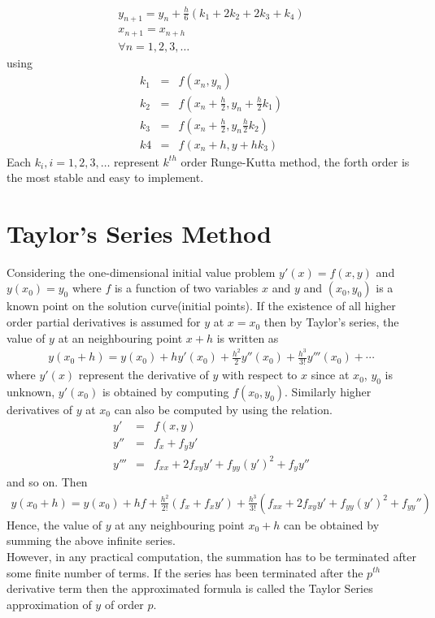 \documentclass[11pt]{report}
\newcommand{\sps}{\\[0.2cm]}
\newcommand{\sprime}{'}
\newcommand{\dprime}{''}
\newcommand{\tprime}{'''}
\begin{document}
	\begin{gather}
		y_{n+1} = y_n+\frac{h}{6}(k_1+2k_2+2k_3+k_4)\sps
		x_{n+1} = x_{n+h}\sps
		\forall n = 1,2,3,\ldots
	\end{gather}
	using 
	\begin{eqnarray}
		k_1 &=& f(x_n,y_n) \sps
		k_2 &=& f(x_n + \frac{h}{2}, y_n + \frac{h}{2}k_1)\sps
		k_3 &=& f(x_n+\frac{h}{2}, y_n \frac{h}{2}k_2)\sps
		k4 &=& f(x_n + h, y+hk_3) 
	\end{eqnarray}
	Each $k_i, i=1,2,3,\ldots$ represent $k^{th}$ order Runge-Kutta method, the forth order is the most stable and easy to implement.
	
	\section{Taylor's Series Method}
	Considering the one-dimensional initial value problem $y\sprime(x) = f(x,y)$ and $y(x_0)=y_0$ where $f$ is a function of two variables $x$ and $y$ and $(x_0,y_0)$ is a known point on the solution curve(initial points). If the existence of all higher order partial derivatives is assumed for $y$ at $x=x_0$ then by Taylor's series, the value of $y$ at an neighbouring point $x+h$ is written as
	\begin{eqnarray}
		y(x_0+h) = y(x_0) + hy\sprime(x_0) + \frac{h^2}{2}y\dprime(x_0) + \frac{h^3}{3!}y\tprime(x_0) + \cdots
	\end{eqnarray}
	where $y\sprime(x)$ represent the derivative of $y$ with respect to $x$ since at $x_0$, $y_0$ is unknown, $y\sprime(x_0)$ is obtained by computing $f(x_0,y_0)$. Similarly higher derivatives of $y$ at $x_0$ can also be computed by using the relation.
	\begin{eqnarray}
		y\sprime &=& f(x,y)\sps
		y\dprime &=& f_x + f_y y\sprime\sps
		y\tprime &=& f_{xx} + 2f_{xy}y\sprime + f_{yy}(y\sprime)^2 + f_y y\dprime 
	\end{eqnarray}
	and so on. Then
	\begin{eqnarray}
		y(x_0+h) = y(x_0) + hf + \frac{h^2}{2!}(f_x + f_x y\sprime) + \frac{h^3}{3!}(f_{xx} + 2f_{xy}y\prime + f_{yy}(y\sprime)^2 + f_{yy}\dprime)
	\end{eqnarray}
	Hence, the value of $y$ at any neighbouring point $x_0+h$ can be obtained by summing the above infinite series.\\
	However, in any practical computation, the summation has to be terminated after some finite number of terms. If the series has been terminated after the $p^{th}$ derivative term then the approximated formula is called the Taylor Series approximation of $y$ of order $p$.
	
\end{document}
